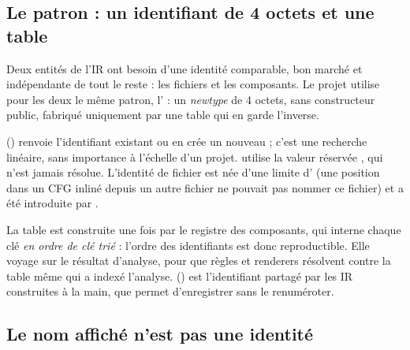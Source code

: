 \subsection{Le patron : un identifiant de 4 octets et une table}

Deux entités de l'IR ont besoin d'une identité comparable, bon marché et indépendante de tout le reste : les fichiers et les composants. Le projet utilise pour les deux le même patron, l' : un \emph{newtype}  de 4 octets, sans constructeur public, fabriqué uniquement par une table qui en garde l'inverse.


 () renvoie l'identifiant existant ou en crée un nouveau ; c'est une recherche linéaire, sans importance à l'échelle d'un projet.  utilise la valeur réservée , qui n'est jamais résolue. L'identité de fichier est née d'une limite d' (une position dans un CFG inliné depuis un autre fichier ne pouvait pas nommer ce fichier) et a été introduite par .



La table est construite une fois par le registre des composants, qui interne chaque clé  \emph{en ordre de clé trié} : l'ordre des identifiants est donc reproductible. Elle voyage sur le résultat d'analyse, pour que règles et renderers résolvent contre la table même qui a indexé l'analyse.  () est l'identifiant partagé par les IR construites à la main, que  permet d'enregistrer sans le renuméroter.

\subsection{Le nom affiché n'est pas une identité}


